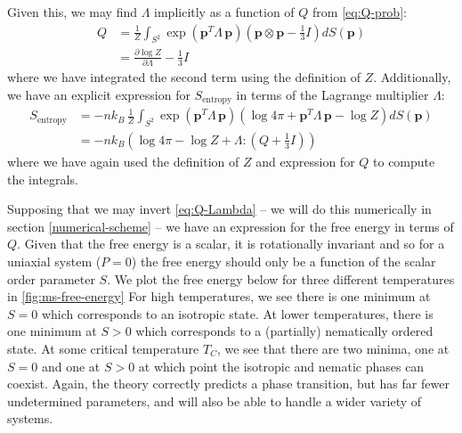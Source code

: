 \documentclass[reqno]{article}
\begin{document}
  Given this, we may find $\Lambda$ implicitly as a function of $Q$ from
  \eqref{eq:Q-prob}:
  \begin{equation} \label{eq:Q-Lambda}
    \begin{split}
      Q
      &=
      \frac{1}{Z} \int_{S^2} \exp(\mathbf{p}^T \Lambda \, \mathbf{p}) \left( \mathbf{p} \otimes \mathbf{p} - \tfrac13 I \right) dS(\mathbf{p}) \\
      &=
      \frac{\partial \log Z}{\partial \Lambda} - \frac13 I
    \end{split}
  \end{equation}
  where we have integrated the second term using the definition of $Z$.
  Additionally, we have an explicit expression for $S_\text{entropy}$ in terms
  of the Lagrange multiplier $\Lambda$:
  \begin{equation}
    \begin{split}
      S_\text{entropy}
      &=
      -n k_B \,
      \frac{1}{Z}
      \int_{S^2}
      \exp(\mathbf{p}^T \Lambda \, \mathbf{p}) \left( \log 4 \pi + \mathbf{p}^T \Lambda \, \mathbf{p} - \log Z \right) dS(\mathbf{p}) \\
      &=
      -n k_B \left(
        \log 4 \pi - \log Z + \Lambda : \left( Q + \tfrac13 I \right)
      \right)
    \end{split}
  \end{equation}
  where we have again used the definition of $Z$ and expression for $Q$ to
  compute the integrals.

  Supposing that we may invert \eqref{eq:Q-Lambda} -- we will do this
  numerically in section \ref{numerical-scheme} -- we have an expression for the
  free energy in terms of $Q$.
  Given that the free energy is a scalar, it is rotationally invariant and so
  for a uniaxial system ($P = 0$) the free energy should only be a function of
  the scalar order parameter $S$.
  We plot the free energy below for three different temperatures in \ref{fig:ms-free-energy}
  For high temperatures, we see there is one minimum at $S = 0$ which
  corresponds to an isotropic state.
  At lower temperatures, there is one minimum at $S > 0$ which corresponds to a
  (partially) nematically ordered state.
  At some critical temperature $T_C$, we see that there are two minima, one at
  $S = 0$ and one at $S > 0$ at which point the isotropic and nematic phases can
  coexist.
  Again, the theory correctly predicts a phase transition, but has far fewer
  undetermined parameters, and will also be able to handle a wider variety of systems.
\end{document}

